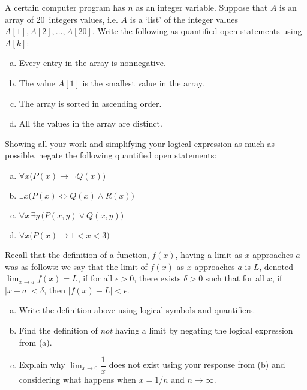 \documentclass[11pt,letterpaper]{article}
\begin{document}
\newpage



 A certain computer program has $n$ as an integer variable. Suppose that $A$ is an array of 20~integers values, i.e. $A$ is a `list' of the integer values $A[1], A[2], \ldots, A[20]$. Write the following as quantified open statements using $A[k]$:
	\begin{enumerate}[(a)]
	\item Every entry in the array is nonnegative.
	\item The value $A[1]$ is the smallest value in the array.
	\item The array is sorted in ascending order. 
	\item All the values in the array are distinct. 
	\end{enumerate}



\newpage



 Showing all your work and simplifying your logical expression as much as possible, negate the following quantified open statements:
	\begin{enumerate}[(a)]
	\item $\forall x \big( P(x) \to \neg Q(x) \big)$
	\item $\exists x \big( P(x) \Longleftrightarrow Q(x) \wedge R(x) \big)$
	\item $\forall x\, \exists y\, \big( P(x, y) \vee Q(x, y) \big)$
	\item $\forall x \big( P(x) \to 1 < x < 3 \big)$
	\end{enumerate}



\newpage



 Recall that the definition of a function, $f(x)$, having a limit as $x$ approaches $a$ was as follows: we say that the limit of $f(x)$ as $x$ approaches $a$ is $L$, denoted $\displaystyle \lim_{x \to a} f(x)= L$, if for all $\epsilon > 0$, there exists $\delta > 0$ such that for all $x$, if $|x - a| < \delta$, then $|f(x) - L| < \epsilon$. 
	\begin{enumerate}[(a)]
	\item Write the definition above using logical symbols and quantifiers.
	\item Find the definition of \textit{not} having a limit by negating the logical expression from (a).
	\item Explain why $\displaystyle \lim_{x \to 0} \dfrac{1}{x}$ does not exist using your response from (b) and considering what happens when $x= 1/n$ and $n \to \infty$. 
	\end{enumerate}
\end{document}
